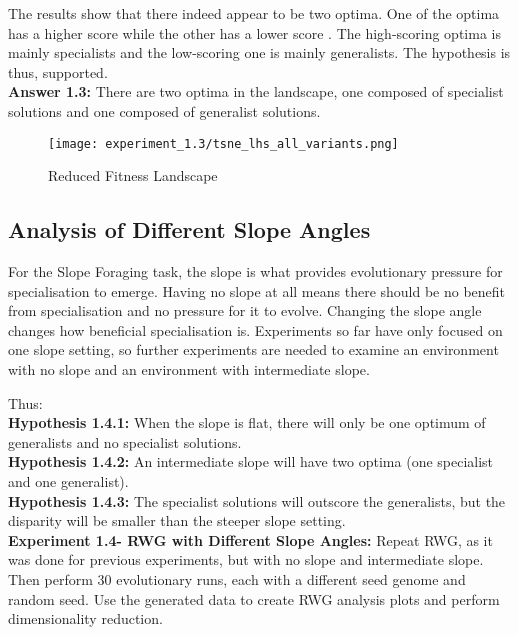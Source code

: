 \documentclass[12pt]{article}
\begin{document}
The results show that there indeed appear to be two optima.
One of the optima has a higher score while the other has a lower score .
The high-scoring optima is mainly specialists and the low-scoring one is mainly generalists.
The hypothesis is thus, supported.\\

\textbf{Answer 1.3:} There are two optima in the landscape, one composed of specialist solutions and one composed of generalist solutions.\\

\begin{figure}[h]
\centering
\texttt{[image: experiment\_1.3/tsne\_lhs\_all\_variants.png]}
\caption{Reduced Fitness Landscape}
\label{fig:tsne}
\end{figure}

\subsection{Analysis of Different Slope Angles}

For the Slope Foraging task, the slope is what provides evolutionary pressure for specialisation to emerge.
Having no slope at all means there should be no benefit from specialisation and no pressure for it to evolve.
Changing the slope angle changes how beneficial specialisation is. 
Experiments so far have only focused on one slope setting, so further experiments are needed to examine an environment with no slope and an environment with intermediate slope.

Thus:\\

\textbf{Hypothesis 1.4.1:} When the slope is flat, there will only be one optimum of generalists and no specialist solutions.\\

\textbf{Hypothesis 1.4.2:} An intermediate slope will have two optima (one specialist and one generalist).\\

\textbf{Hypothesis 1.4.3:} The specialist solutions will outscore the generalists, but the disparity will be smaller than the steeper slope setting. \\

\textbf{Experiment 1.4- RWG with Different Slope Angles:} Repeat RWG, as it was done for previous experiments, but with no slope and intermediate slope.
Then perform 30 evolutionary runs, each with a different seed genome and random seed.
Use the generated data to create RWG analysis plots and perform dimensionality reduction.\\
\end{document}
